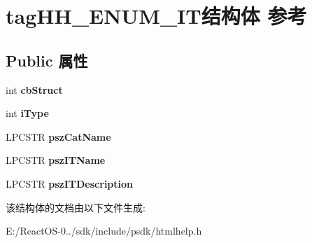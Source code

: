 \hypertarget{structtag_h_h___e_n_u_m___i_t}{}\section{tag\+H\+H\+\_\+\+E\+N\+U\+M\+\_\+\+I\+T结构体 参考}
\label{structtag_h_h___e_n_u_m___i_t}
\subsection*{Public 属性}
\begin{DoxyCompactItemize}
\item 
\mbox{\label{structtag_h_h___e_n_u_m___i_t_a0596d73f04381ed0ea6296ce86e86ecd}} 
int {\bfseries cb\+Struct}
\item 
\mbox{\label{structtag_h_h___e_n_u_m___i_t_a57e208dc8ecb1c814449c607f738f42a}} 
int {\bfseries i\+Type}
\item 
\mbox{\label{structtag_h_h___e_n_u_m___i_t_aaed4ab2eb15c074a69b06b66b853e8a4}} 
L\+P\+C\+S\+TR {\bfseries psz\+Cat\+Name}
\item 
\mbox{\label{structtag_h_h___e_n_u_m___i_t_a4f4c086698862731d66d59775e99f6c0}} 
L\+P\+C\+S\+TR {\bfseries psz\+I\+T\+Name}
\item 
\mbox{\label{structtag_h_h___e_n_u_m___i_t_ada32f7f7566a51a9cb9a1912f2e83357}} 
L\+P\+C\+S\+TR {\bfseries psz\+I\+T\+Description}
\end{DoxyCompactItemize}


该结构体的文档由以下文件生成\+:\begin{DoxyCompactItemize}
\item 
E\+:/\+React\+O\+S-\/0../sdk/include/psdk/htmlhelp.\+h\end{DoxyCompactItemize}
